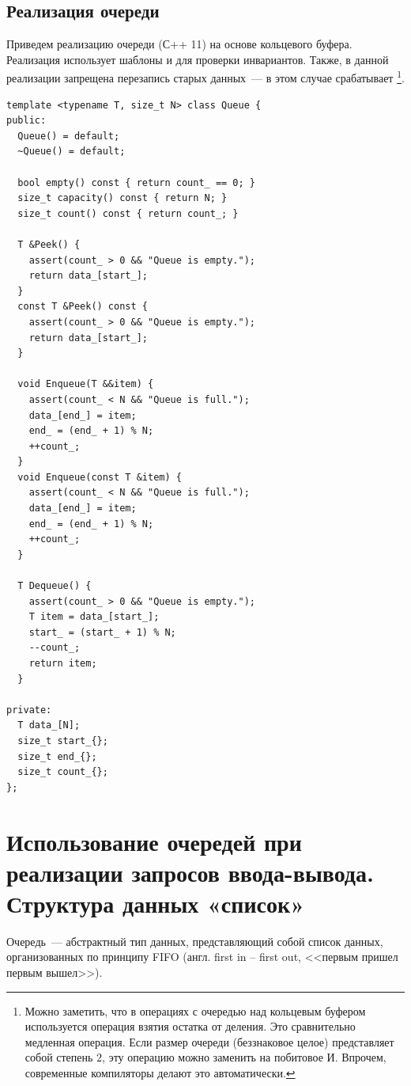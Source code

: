 \subsection{Реализация очереди}
Приведем реализацию очереди (С++ 11) на основе кольцевого буфера. Реализация использует шаблоны и 
для проверки инвариантов. Также, в данной реализации запрещена перезапись старых данных~--- в этом случае срабатывает  \footnote{Можно заметить, что в операциях с очередью над кольцевым буфером используется операция взятия остатка от деления. Это сравнительно
  медленная операция. Если размер очереди (беззнаковое целое) представляет собой степень \(2\), эту операцию можно заменить на побитовое И. Впрочем, современные
  компиляторы делают это автоматически.}.

\begin{verbatim}
template <typename T, size_t N> class Queue {
public:
  Queue() = default;
  ~Queue() = default;

  bool empty() const { return count_ == 0; }
  size_t capacity() const { return N; }
  size_t count() const { return count_; }

  T &Peek() {
    assert(count_ > 0 && "Queue is empty.");
    return data_[start_];
  }
  const T &Peek() const {
    assert(count_ > 0 && "Queue is empty.");
    return data_[start_];
  }

  void Enqueue(T &&item) {
    assert(count_ < N && "Queue is full.");
    data_[end_] = item;
    end_ = (end_ + 1) % N;
    ++count_;
  }
  void Enqueue(const T &item) {
    assert(count_ < N && "Queue is full.");
    data_[end_] = item;
    end_ = (end_ + 1) % N;
    ++count_;
  }

  T Dequeue() {
    assert(count_ > 0 && "Queue is empty.");
    T item = data_[start_];
    start_ = (start_ + 1) % N;
    --count_;
    return item;
  }

private:
  T data_[N];
  size_t start_{};
  size_t end_{};
  size_t count_{};
};
\end{verbatim}


%
%

\section{Использование очередей при реализации запросов ввода-вывода. Структура данных «список»}
Очередь~--- абстрактный тип данных, представляющий собой список данных, организованных по принципу FIFO (англ. first in -- first out, <<первым пришел первым вышел>>).

